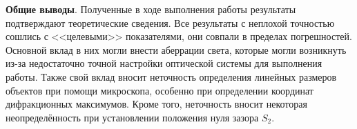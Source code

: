 \documentclass[a4paper,12pt]{article} %
\begin{document}
\hfill \break \textbf{Общие выводы}. Полученные в ходе выполнения работы результаты подтверждают теоретические сведения. Все результаты с неплохой точностью сошлись с <<целевыми>> показателями, они совпали в пределах погрешностей. Основной вклад в них могли внести аберрации света, которые могли возникнуть из-за недостаточно точной настройки оптической системы для выполнения работы. Также свой вклад вносит неточность определения линейных размеров объектов при помощи микроскопа, особенно при определении координат дифракционных максимумов. Кроме того, неточность вносит некоторая неопределённость при установлении положения нуля зазора $ S_2 $.
\end{document}

